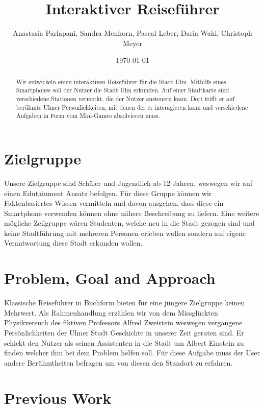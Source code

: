 \documentclass[]{hci-proposal}
\title{Interaktiver Reiseführer}
\author{Anastasia Parlapani, Sandra Menhorn, Pascal Leber, Daria Wahl, Christoph Meyer}
\date{\today}
\begin{document}

\maketitle

\begin{abstract}
  Wir entwickeln einen interaktiven Reiseführer für die Stadt Ulm. Mithilfe eines Smartphones soll
  der Nutzer die Stadt Ulm erkunden. Auf einer Stadtkarte sind verschiedene Stationen vermerkt, die
  der Nutzer ansteuern kann. Dort trifft er auf berühmte Ulmer Persönlichkeiten, mit denen der er
  interagieren kann und verschiedene Aufgaben in Form vom Mini-Games absolvieren muss. 
  
  
  
\end{abstract}


\section{Zielgruppe}
Unsere Zielgruppe sind Schüler und Jugendlich ab 12 Jahren, weswegen wir auf einen Edutainment Ansatz befolgen.
Für diese Gruppe können wir Faktenbasiertes Wissen vermitteln und davon ausgehen, dass diese ein Smartphone verwenden können ohne nähere Beschreibung zu liefern.
Eine weitere mögliche Zeilgruppe wären Studenten, welche neu in die Stadt gezogen sind und keine Stadtführung mit mehreren Personen erleben wollen sondern auf eigene Verantwortung diese Stadt erkunden wollen.

\section{Problem, Goal and Approach}
Klassische Reiseführer in Buchform bieten für eine jüngere Zielgruppe keinen Mehrwert.
Als Rahmenhandlung erzählen wir von dem Missglückten Physikversuch des fiktiven Professors Alfred Zweistein weswegen vergangene Persönlichkeiten der Ulmer Stadt Geschichte in unserer Zeit geraten sind.
Er schickt den Nutzer als seinen Assistenten in die Stadt um Albert Einstein zu finden welcher ihm bei dem Problem helfen soll.
Für diese Aufgabe muss der User andere Berühmtheiten befragen um von diesen den Standort zu erfahren.


\section{Previous Work}
\end{document}
